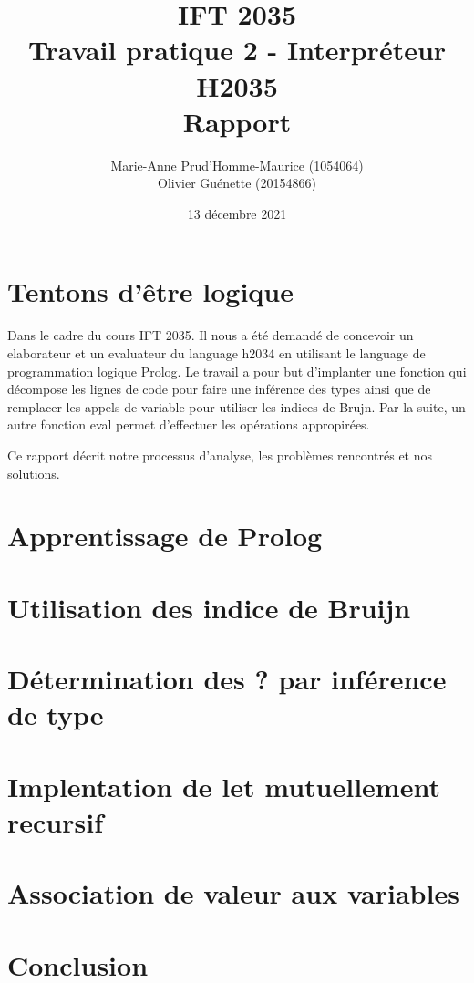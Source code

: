 \documentclass[12pt, letterpaper]{article}
\title{IFT 2035 \\ Travail pratique 2 - Interpréteur H2035 \\ Rapport }
\author{ Marie-Anne Prud'Homme-Maurice (1054064) 
\\ Olivier Guénette (20154866)}
\date{13 décembre 2021}
\begin{document}
\maketitle

\section*{Tentons d'être logique} 

Dans le cadre du cours IFT 2035. Il nous a été demandé de concevoir un 
elaborateur et un evaluateur du language h2034 en utilisant le language 
de programmation logique Prolog. Le travail a pour but d'implanter une 
fonction qui décompose les lignes de code pour faire une inférence des types
ainsi que de remplacer les appels de variable pour utiliser les indices de 
Brujn. Par la suite, un autre fonction eval permet d'effectuer les opérations 
appropirées.

Ce rapport décrit notre processus d'analyse, les problèmes rencontrés et nos
solutions.

\section*{Apprentissage de Prolog}

\section*{Utilisation des indice de Bruijn}

\section*{Détermination des ? par inférence de type}

\section*{Implentation de let mutuellement recursif}

\section*{Association de valeur aux variables}

\section*{Conclusion}
\end{document}
